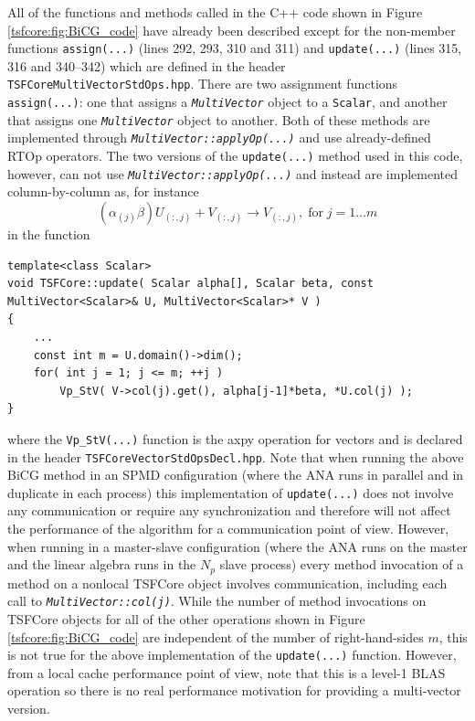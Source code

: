 %
All of the functions and methods called in the C++ code shown in
Figure \ref{tsfcore:fig:BiCG_code} have already been described except
for the non-member functions \texttt{assign(...)} (lines 292, 293, 310
and 311) and \texttt{update(...)} (lines 315, 316 and 340--342) which
are defined in the header \texttt{TSFCore\-Multi\-Vector\-Std\-Ops.hpp}.
There are two assignment functions \texttt{assign(...)}: one that
assigns a \texttt{\textit{Multi\-Vector}} object to a \texttt{Scalar},
and another that assigns one \texttt{\textit{Multi\-Vector}} object to
another.  Both of these methods are implemented through
\texttt{\textit{Multi\-Vector\-::applyOp(\-...)}} and use already-defined
RTOp operators.  The two versions of the \texttt{update(...)} method
used in this code, however, can not use
\texttt{\textit{Multi\-Vector\-::applyOp(\-...)}} and instead are
implemented column-by-column as, for instance
%
\[
(\alpha_{(j)} \beta) U_{(:,j)} + V_{(:,j)} \rightarrow V_{(:,j)}, \; \mbox{for} \; j = 1 \ldots m
\]
%
in the function

{\scriptsize\begin{verbatim}
template<class Scalar>
void TSFCore::update( Scalar alpha[], Scalar beta, const MultiVector<Scalar>& U, MultiVector<Scalar>* V )
{
    ...
    const int m = U.domain()->dim();
    for( int j = 1; j <= m; ++j )
        Vp_StV( V->col(j).get(), alpha[j-1]*beta, *U.col(j) );
}
\end{verbatim}}

\noindent where the \texttt{Vp\_StV(...)} function is the axpy operation for
vectors and is declared in the header
\texttt{TSFCore\-Vector\-StdOps\-Decl.hpp}.  Note that when running the
above BiCG method in an SPMD configuration (where the ANA runs in
parallel and in duplicate in each process) this implementation of
\texttt{update(...)} does
not involve any communication or require any synchronization and
therefore will not affect the performance of the algorithm for a
communication point of view.  However, when running in a master-slave
configuration (where the ANA runs on the master and the linear algebra
runs in the $N_p$ slave process) every method invocation of a method
on a nonlocal TSFCore object involves communication, including each
call to
\texttt{\textit{Multi\-Vector\-::col(j)}}.  While the number of method
invocations on TSFCore objects for all of the other operations shown in
Figure \ref{tsfcore:fig:BiCG_code} are independent of the number of
right-hand-sides $m$, this is not true for the above implementation of
the \texttt{update(...)} function.  However, from a local cache
performance point of view, note that this is a level-1 BLAS operation
so there is no real performance motivation for providing a
multi-vector version.

